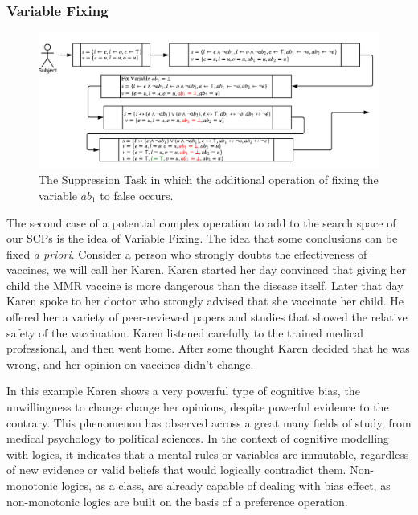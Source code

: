 \documentclass{article}
\begin{document}
\subsubsection*{Variable Fixing} \label{ssec:variableFixing}

\begin{figure}
\begin{center}
\includegraphics[scale=0.7]{suppressionSCP_mod2}
\end{center}

\caption{The Suppression Task in which the additional operation of fixing the variable $ab_1$ to false occurs.}
\label{fig:supmod2}
\end{figure}

The second case of a potential complex operation to add to the search space of our SCPs is the idea of Variable Fixing. The idea that some  conclusions can be fixed \textit{a priori}. Consider a person who strongly doubts the effectiveness of vaccines, we will call her Karen. Karen started her day convinced that giving her child the MMR vaccine is more dangerous than the disease itself. Later that day Karen spoke to her doctor who strongly advised that she vaccinate her child. He offered her a variety of peer-reviewed papers and studies that showed the relative safety of the vaccination. Karen listened carefully to the trained medical professional, and then went home. After some thought Karen decided that he was wrong, and her opinion on vaccines didn't change.

In this example Karen shows a very powerful type of cognitive bias, the unwillingness to change change her opinions, despite powerful evidence to the contrary. This phenomenon has observed across a great many fields of study, from medical psychology \citep{brown2010omission} \citep{wroe2005feeling} to political sciences\citep{tappin2017heart}. In the context of cognitive modelling with logics, it indicates that a mental rules or variables are immutable, regardless of new evidence or valid beliefs that would logically contradict them. Non-monotonic logics, as a class, are already capable of dealing with bias effect, as non-monotonic logics are built on the basis of a preference operation.
\end{document}

